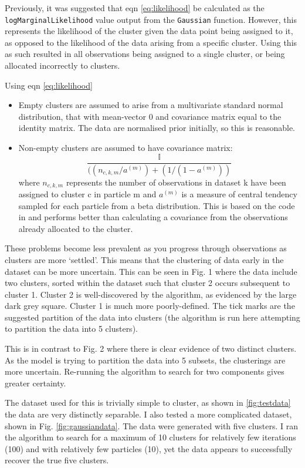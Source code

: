 \documentclass[10pt,a4paper]{article}
\begin{document}
\noindent
Previously, it was suggested that eqn \ref{eq:likelihood} be calculated as the \texttt{logMarginalLikelihood} value output from the \texttt{Gaussian} function. However, this represents the likelihood of the cluster given the data point being assigned to it, as opposed to the likelihood of the data arising from a specific cluster. Using this as such resulted in all observations being assigned to a single cluster, or being allocated incorrectly to clusters.

\noindent
Using eqn \ref{eq:likelihood}
\begin{itemize}
\item Empty clusters are assumed to arise from a multivariate standard normal distribution, that with mean-vector $0$ and covariance matrix equal to the identity matrix. The data are normalised prior initially, so this is reasonable.
\item Non-empty clusters are assumed to have covariance matrix:
\begin{equation}
\frac{\mathbb{I}}{((n_{c,k,m}/a^(m)) + (1 / (1 - a^(m))) }
\end{equation}
where $n_{c,k,m}$ represents the number of observations in dataset k have been assigned to cluster c in particle m and $a^{(m)}$ is a measure of central tendency sampled for each particle from a beta distribution. This is based on the code in \cite{griffin2014sequential} and performs better than calculating a covariance from the observations already allocated to the cluster.
\end{itemize}

These problems become less prevalent as you progress through observations as clusters are more `settled'. This means that the clustering of data early in the dataset can be more uncertain. This can be seen in Fig. 1 where the data include two clusters, sorted within the dataset such that cluster 2 occurs subsequent to cluster 1.
Cluster 2 is well-discovered by the algorithm, as evidenced by the large dark grey square. Cluster 1 is much more poorly-defined. The tick marks are the suggested partition of the data into clusters (the algorithm is run here attempting to partition the data into 5 clusters).

This is in contrast to Fig. 2 where there is clear evidence of two distinct clusters. As the model is trying to partition the data into 5 subsets, the clusterings are more uncertain. Re-running the algorithm to search for two components gives greater certainty.

The dataset used for this is trivially simple to cluster, as shown in \ref{fig:testdata} the data are very distinctly separable. I also tested a more complicated dataset, shown in Fig. \ref{fig:gaussiandata}. The data were generated with five clusters. I ran the algorithm to search for a maximum of 10 clusters for relatively few iterations (100) and with relatively few particles (10), yet the data appears to successfully recover the true five clusters.
\end{document}
